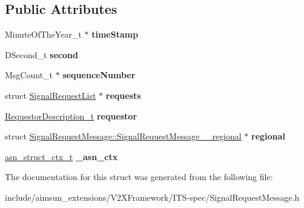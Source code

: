 \subsection*{Public Attributes}
\begin{DoxyCompactItemize}
\item 
Minute\+Of\+The\+Year\+\_\+t $\ast$ {\bfseries time\+Stamp}\hypertarget{structSignalRequestMessage_a4997121e59c50a3f70f520d1e2394ded}{}\label{structSignalRequestMessage_a4997121e59c50a3f70f520d1e2394ded}

\item 
D\+Second\+\_\+t {\bfseries second}\hypertarget{structSignalRequestMessage_a2bd10bb1939556e083f59abdcc849424}{}\label{structSignalRequestMessage_a2bd10bb1939556e083f59abdcc849424}

\item 
Msg\+Count\+\_\+t $\ast$ {\bfseries sequence\+Number}\hypertarget{structSignalRequestMessage_ad699b8dcc94cacc9aa41282760bdeb7e}{}\label{structSignalRequestMessage_ad699b8dcc94cacc9aa41282760bdeb7e}

\item 
struct \hyperlink{structSignalRequestList}{Signal\+Request\+List} $\ast$ {\bfseries requests}\hypertarget{structSignalRequestMessage_a95ea6379544c4aeba9948cd1a79b168b}{}\label{structSignalRequestMessage_a95ea6379544c4aeba9948cd1a79b168b}

\item 
\hyperlink{structRequestorDescription}{Requestor\+Description\+\_\+t} {\bfseries requestor}\hypertarget{structSignalRequestMessage_a0806838b8e37a98ae6709ad8f1c5428d}{}\label{structSignalRequestMessage_a0806838b8e37a98ae6709ad8f1c5428d}

\item 
struct \hyperlink{structSignalRequestMessage_1_1SignalRequestMessage____regional}{Signal\+Request\+Message\+::\+Signal\+Request\+Message\+\_\+\+\_\+regional} $\ast$ {\bfseries regional}\hypertarget{structSignalRequestMessage_a8b2af537e027d19bfc68f858d58e0180}{}\label{structSignalRequestMessage_a8b2af537e027d19bfc68f858d58e0180}

\item 
\hyperlink{structasn__struct__ctx__s}{asn\+\_\+struct\+\_\+ctx\+\_\+t} {\bfseries \+\_\+asn\+\_\+ctx}\hypertarget{structSignalRequestMessage_a975f4d5bf511a60592217739d893cc1b}{}\label{structSignalRequestMessage_a975f4d5bf511a60592217739d893cc1b}

\end{DoxyCompactItemize}


The documentation for this struct was generated from the following file\+:\begin{DoxyCompactItemize}
\item 
include/aimsun\+\_\+extensions/\+V2\+X\+Framework/\+I\+T\+S-\/spec/Signal\+Request\+Message.\+h\end{DoxyCompactItemize}
